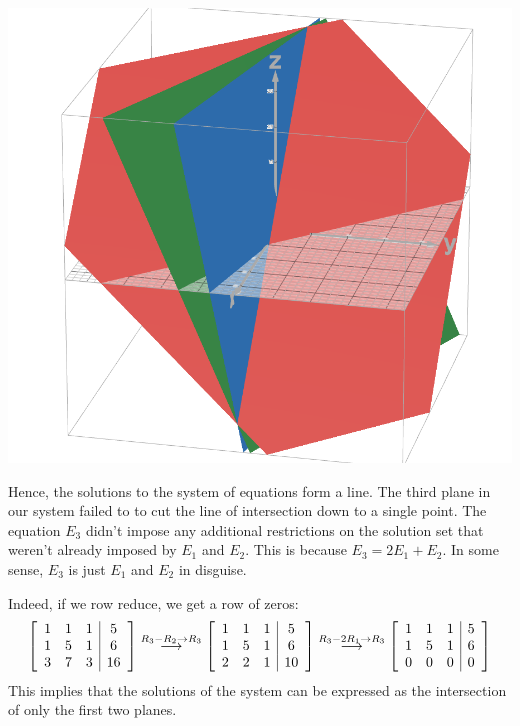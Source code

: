 \documentclass[10pt]{article}
\newenvironment{augmentedmatrix}[1] %
{\left[\begin{array}{#1}}
    {\end{array}\right]}
\theoremstyle{definition}
\begin{document}
\begin{center}
  \includegraphics[scale=.15]{images/dependent-system-example}
\end{center}

Hence, the solutions to the system of equations form a line. The third plane
in our system failed to to cut the line of intersection down to a single
point. The equation $E_{3}$ didn't impose any additional restrictions on the
solution set that weren't already imposed by $E_{1}$ and $E_{2}$. This is
because $E_{3}=2E_{1}+E_{2}$. In some sense, $E_{3}$ is just $E_{1}$ and
$E_{2}$ in disguise.

Indeed, if we row reduce, we get a row of zeros:
\begin{align*}
  \begin{augmentedmatrix}{ccc|c}
    1&1&1&5\\
    1&5&1&6\\
    3&7&3&16
  \end{augmentedmatrix}
           \overset{R_{3}-R_{2} \to R_{3}}{\longrightarrow}
  \begin{augmentedmatrix}{ccc|c}
    1&1&1&5\\
    1&5&1&6\\
    2&2&1&10
  \end{augmentedmatrix}
           \overset{R_{3}-2R_{1} \to R_{3}}{\longrightarrow}
  \begin{augmentedmatrix}{ccc|c}
    1&1&1&5\\
    1&5&1&6\\
    0&0&0&0
  \end{augmentedmatrix}
\end{align*}
This implies that the solutions of the system can be expressed as the
intersection of only the first two planes.
\end{document}
